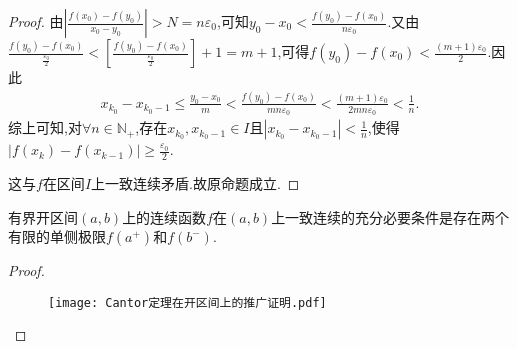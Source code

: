 \documentclass[lang=cn,newtx,10pt,scheme=chinese]{elegantbook}
\begin{document}
\begin{proof}
        由\(\left| \frac{f\left( x_0 \right) -f\left( y_0 \right)}{x_0 - y_0} \right|>N=n\varepsilon_0\),可知\(y_0 - x_0<\frac{f\left( y_0 \right) -f\left( x_0 \right)}{n\varepsilon_0}\).又由\(\frac{f\left( y_0 \right) -f\left( x_0 \right)}{\frac{\varepsilon _0}{2}}<\left[ \frac{f\left( y_0 \right) -f\left( x_0 \right)}{\frac{\varepsilon _0}{2}} \right] + 1 = m + 1\),可得\(f\left( y_0 \right) -f\left( x_0 \right) <\frac{\left( m + 1 \right) \varepsilon _0}{2}\).因此
        \begin{align*}
            x_{k_0}-x_{k_0 - 1}\leq \frac{y_0 - x_0}{m}<\frac{f\left( y_0 \right) -f\left( x_0 \right)}{mn\varepsilon_0}<\frac{\left( m + 1 \right) \varepsilon _0}{2mn\varepsilon_0}<\frac{1}{n}.
        \end{align*}
        综上可知,对\(\forall n\in \mathbb{N} _+\),存在\(x_{k_0},x_{k_0 - 1}\in I\)且\(\left| x_{k_0}-x_{k_0 - 1} \right|<\frac{1}{n}\),使得\(\left| f\left( x_k \right) -f\left( x_{k - 1} \right) \right|\geq \frac{\varepsilon _0}{2}\).
        
        这与\(f\)在区间\(I\)上一致连续矛盾.故原命题成立.
\end{proof}

\begin{proposition}[Cantor定理在开区间上的推广]\label{pro:Cantor定理在开区间上的推广}
    有界开区间\((a,b)\)上的连续函数\(f\)在\((a,b)\)上一致连续的充分必要条件是存在两个有限的单侧极限\(f(a^{+})\)和\(f(b^{-})\).
\end{proposition}
\begin{proof}
    \begin{figure}[htbp]
        \centering
        \texttt{[image: Cantor定理在开区间上的推广证明.pdf]}
    \end{figure} 
\end{proof}
\end{document}
